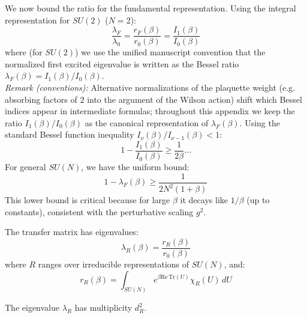 We now bound the ratio for the fundamental representation.
Using the integral representation for $SU(2)$ ($N=2$):
\[
\frac{\lambda_F}{\lambda_0} = \frac{r_F(\beta)}{r_0(\beta)} = \frac{I_1(\beta)}{I_0(\beta)}
\]
where (for $SU(2)$) we use the unified manuscript convention that the normalized first excited eigenvalue is written as the Bessel ratio $\lambda_F(\beta)=I_1(\beta)/I_0(\beta)$.
\\
\emph{Remark (conventions):} Alternative normalizations of the plaquette weight (e.g. absorbing factors of $2$ into the argument of the Wilson action) shift which Bessel indices appear in intermediate formulas; throughout this appendix we keep the ratio $I_1(\beta)/I_0(\beta)$ as the canonical representation of $\lambda_F(\beta)$.
Using the standard Bessel function inequality $I_\nu(\beta) / I_{\nu-1}(\beta) < 1$:
\[
1 - \frac{I_1(\beta)}{I_0(\beta)} \ge \frac{1}{2\beta} \dots
\]
For general $SU(N)$, we have the uniform bound:
\[
1 - \lambda_F(\beta) \ge \frac{1}{2N^2(1+\beta)}
\]
This lower bound is critical because for large $\beta$ it decays like $1/\beta$ (up to constants), consistent with the perturbative scaling $g^2$.

\begin{theorem}
\label{thm:spectral-decomp-detailed}
The transfer matrix has eigenvalues:
\begin{equation}
\lambda_R(\beta) = \frac{r_R(\beta)}{r_0(\beta)}
\end{equation}
where $R$ ranges over irreducible representations of $SU(N)$, and:
\begin{equation}
r_R(\beta) = \int_{SU(N)} e^{\beta \mathrm{Re}\,\mathrm{Tr}(U)} \chi_R(U) \, dU
\end{equation}

The eigenvalue $\lambda_R$ has multiplicity $d_R^2$.
\end{theorem}

